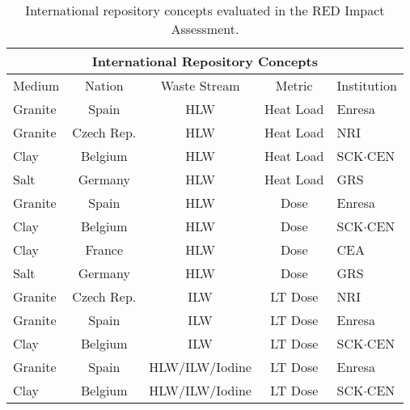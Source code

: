 
\begin{table}[h!]
  \centering
  \footnotesize{
  \begin{tabularx}{\textwidth}{|l|c|c|c|X|}
    \multicolumn{5}{c}{\textbf{International Repository Concepts}}\\
    \hline
    Medium     & Nation      & Waste Stream   & Metric    & Institution \\
    \hline 
    Granite     & Spain       & HLW            & Heat Load & Enresa  \\
    Granite     & Czech Rep.  & HLW            & Heat Load & NRI \\
    Clay        & Belgium     & HLW            & Heat Load & SCK$\cdot$CEN \\
    Salt        & Germany     & HLW            & Heat Load & GRS \\
    Granite     & Spain       & HLW            & Dose      & Enresa  \\
    Clay        & Belgium     & HLW            & Dose      & SCK$\cdot$CEN \\
    Clay        & France      & HLW            & Dose      & CEA \\
    Salt        & Germany     & HLW            & Dose      & GRS  \\
    Granite     & Czech Rep.  & ILW            & LT Dose   & NRI  \\
    Granite     & Spain       & ILW            & LT Dose   & Enresa  \\
    Clay        & Belgium     & ILW            & LT Dose   & SCK$\cdot$CEN  \\
    Granite     & Spain       & HLW/ILW/Iodine & LT Dose   & Enresa \\
    Clay        & Belgium     & HLW/ILW/Iodine & LT Dose   & SCK$\cdot$CEN \\
    \hline
  \end{tabularx}
  \caption[International repository concepts.]{International repository concepts evaluated in the RED Impact 
  Assessment.\cite{von_lensa_red-impact_2008}}
  \label{tab:red}
  }
\end{table}



